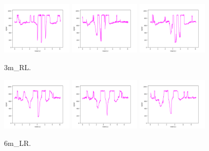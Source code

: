 \begin{figure}[!ht]
\begin{center}
\includegraphics[width=0.3\textwidth]{../data/3m_RL2/3m_RL2_1.png}
\includegraphics[width=0.3\textwidth]{../data/3m_RL2/3m_RL2_2.png}
\includegraphics[width=0.3\textwidth]{../data/3m_RL2/3m_RL2_3.png}
\caption{3m\_RL.\label{fig:3m_RL}}
\end{center}
\end{figure}

\begin{figure}[!ht]
\begin{center}
\includegraphics[width=0.3\textwidth]{../data/6m_LR/6m_LR_1.png}
\includegraphics[width=0.3\textwidth]{../data/6m_LR/6m_LR_2.png}
\includegraphics[width=0.3\textwidth]{../data/6m_LR/6m_LR_3.png}
\caption{6m\_LR.\label{fig:6m_LR}}
\end{center}
\end{figure}

